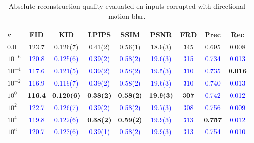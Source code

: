 \documentclass[twoside,11pt]{article}
\begin{document}
\begin{table}[ht!]
\centering
\renewcommand{\arraystretch}{1.4}
\setlength{\tabcolsep}{6pt}
\small
\begin{tabular}{lcccccccc}
\toprule
\rowcolor{gray!20}
\multicolumn{9}{c}{\textbf{Motion Blur - Absolute Scores}} \\
\textbf{$\kappa$} & \textbf{FID} & \textbf{KID} & \textbf{LPIPS} & \textbf{SSIM} & \textbf{PSNR} & \textbf{FRD} & \textbf{Prec} & \textbf{Rec} \\
\midrule
$0.0$        & 123.7 & 0.126(7) & 0.41(2) & 0.56(1) & 18.9(3) & 345 & 0.695 & 0.008 \\
$10^{-6}$    & \textcolor{blue}{120.8} & \textcolor{blue}{0.125(6)} & \textcolor{blue}{0.39(2)} & \textcolor{blue}{0.58(2)} & \textcolor{blue}{19.6(3)} & \textcolor{blue}{315} & \textcolor{blue}{0.734} & \textcolor{blue}{0.013} \\
$10^{-4}$    & \textcolor{blue}{117.6} & \textcolor{blue}{0.121(5)} & \textcolor{blue}{0.39(2)} & \textcolor{blue}{0.58(2)} & \textcolor{blue}{19.5(3)} & \textcolor{blue}{310} & \textcolor{blue}{0.735} & \textbf{\textcolor{green!50!black}{0.016}} \\
$10^{-2}$    & \textcolor{blue}{116.9} & \textcolor{blue}{0.119(7)} & \textcolor{blue}{0.39(2)} & \textcolor{blue}{0.58(2)} & \textcolor{blue}{19.6(3)} & \textcolor{blue}{310} & \textcolor{blue}{0.740} & \textcolor{blue}{0.013} \\
$10^{0}$     & \textbf{\textcolor{green!50!black}{116.4}} & \textbf{\textcolor{green!50!black}{0.120(6)}} & \textbf{\textcolor{green!50!black}{0.38(2)}} & \textbf{\textcolor{green!50!black}{0.58(2)}} & \textbf{\textcolor{green!50!black}{19.9(3)}} & \textbf{\textcolor{green!50!black}{307}} & \textcolor{blue}{0.742} & \textcolor{blue}{0.012} \\
$10^{2}$     & \textcolor{blue}{122.7} & \textcolor{blue}{0.126(7)} & \textcolor{blue}{0.39(2)} & \textcolor{blue}{0.58(2)} & \textcolor{blue}{19.7(3)} & \textcolor{blue}{308} & \textcolor{blue}{0.756} & \textcolor{blue}{0.009} \\
$10^{4}$     & \textcolor{blue}{119.8} & \textcolor{blue}{0.122(6)} & \textbf{\textcolor{green!50!black}{0.38(2)}} & \textbf{\textcolor{green!50!black}{0.59(2)}} & \textcolor{blue}{19.9(3)} & \textcolor{blue}{313} & \textbf{\textcolor{green!50!black}{0.757}} & \textcolor{blue}{0.012} \\
$10^{6}$     & \textcolor{blue}{120.7} & \textcolor{blue}{0.123(6)} & \textcolor{blue}{0.39(1)} & \textcolor{blue}{0.58(2)} & \textcolor{blue}{19.9(3)} & \textcolor{blue}{313} & \textcolor{blue}{0.754} & \textcolor{blue}{0.010} \\
\bottomrule
\end{tabular}
\caption{Absolute reconstruction quality evaluated on inputs corrupted with directional motion blur.}
\label{tab:robustness_motion_blur_abs}
\end{table}
\end{document}

